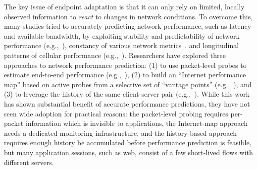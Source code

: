The key issue of endpoint adaptation is that it can only rely 
on limited, locally observed information to {\em react} to
changes in network conditions.
To overcome this, many studies tried to accurately 
predicting network performance, such as latency and
available bandwidth, by exploiting
stability and predictability of network performance
(e.g.,~\cite{hu2005measurement}), constancy of various network
metrics~\cite{zhang2001constancy,balakrishnan1997analyzing}, 
and longitudinal patterns of cellular
performance (e.g.,~\cite{nikravesh2014mobile}).
%
Researchers have explored three approaches to network performance prediction:
(1) to use  packet-level probes to
estimate end-to-end performance 
(e.g.,~\cite{prasad2003bandwidth,
hu2004locating, strauss2003measurement, jain2003end}),
(2) to build an ``Internet performance map''
based on active probes from a selective set of 
``vantage points'' (e.g.,~\cite{iplaneosdi, seshan1997spand,ramasubramanian2009treeness,
dabek2004vivaldi}), and 
(3) to leverage the
history of the  same client-server pair 
(e.g.,~\cite{vazhkudai2001predicting,
jain2005end, swany2002multivariate,
mirza2007machine, he2005predictability}).
While this work has shown substantial benefit of accurate performance
predictions, they have not seen wide adoption for practical 
reasons: the packet-level probing requires 
per-packet information which is invisible to applications,
the Internet-map approach needs a dedicated 
monitoring infrastructure, and the history-based approach requires
enough history be accumulated before performance prediction is 
feasible, but many application sessions, such as web, 
consist of a few short-lived flows with different servers.






